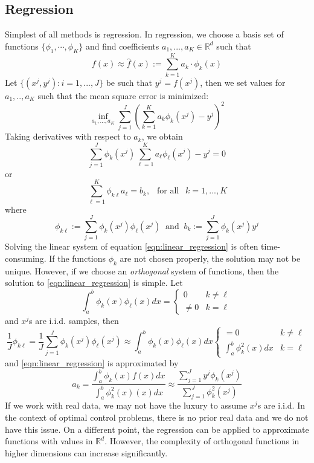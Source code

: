 \documentclass[11pt]{book}
\begin{document}
\subsection{Regression}
Simplest of all methods is regression. In regression, we choose a basis set of functions $\{\phi_1,\cdots,\phi_K\}$ and find coefficients $a_1,...,a_K\in\mathbb{R}^d$ such that 
\[
f(x)\approx \hat{f}(x):=\sum_{k=1}^Ka_k\cdot \phi_k(x)
\]
Let $\{(x^j,y^j):i=1,...,J\}$ be such that $y^j=f(x^j)$, then we set values for $a_1,..,a_K$ such that the mean square error is minimized: 
\begin{equation}
\label{prob:inf_regresion}
\inf_{a_1,...,a_K}\sum_{j=1}^J\left(\sum_{k=1}^{K} a_k \phi_k(x^j)-y^j\right)^2
\end{equation}
Taking derivatives with respect to $a_k$, we obtain
\[
\sum_{j=1}^J\phi_{k}(x^j)\sum_{\ell=1}^{K} a_{\ell} \phi_{\ell}(x^j)-y^j=0
\]
or
\begin{equation}
    \label{eqn:linear_regression}
\sum_{\ell=1}^{K} \phi_{k\ell}a_{\ell}=b_{k},~~\text{ for all }~~k=1,...,K
\end{equation}
where
\[
\phi_{k\ell}:=\sum_{j=1}^J\phi_{k}(x^j)\phi_{\ell}(x^j)~\text{ and }~b_k:=\sum_{j=1}^J\phi_{k}(x^j)y^j
\]
Solving the linear system of equation \eqref{eqn:linear_regression} is often time-consuming. If the functions $\phi_k$ are not chosen properly, the solution may not be unique. However, if we choose an \emph{orthogonal} system of functions, then the solution to \eqref{eqn:linear_regression} is simple. Let 
\[
\int_a^b \phi_k(x)\phi_{\ell}(x)dx=
\begin{cases}
    0&k\neq\ell\\
    \neq0&k=\ell
\end{cases}
\]
and $x^j$s are i.i.d. samples, then
\[
\frac{1}{J}\phi_{k\ell}=\frac{1}{J}\sum_{j=1}^J\phi_{k}(x^j)\phi_{\ell}(x^j)\approx \int_a^b \phi_k(x)\phi_{\ell}(x)dx\begin{cases}
    =0&k\neq\ell\\
    \int_a^b \phi^2_k(x)dx&k=\ell
\end{cases}
\]
and \eqref{eqn:linear_regression} is approximated by
\[
a_k = \frac{\int_a^b \phi_k(x)f(x)dx}{\int_a^b \phi^2_k(x)(x)dx} \approx \frac{\sum_{j=1}^{J}y^j\phi_{k}(x^{j})}{\sum_{j=1}^{J}\phi^2_{k}(x^{j})}
\]
If we work with real data, we may not have the luxury to assume $x^j$s are i.i.d. In the context of optimal control problems, there is no prior real data and we do not have this issue. On a different point, the regression can be applied to approximate functions with values in $\mathbb{R}^d$. However, the complexity of orthogonal functions in higher dimensions can increase significantly. 
\end{document}
